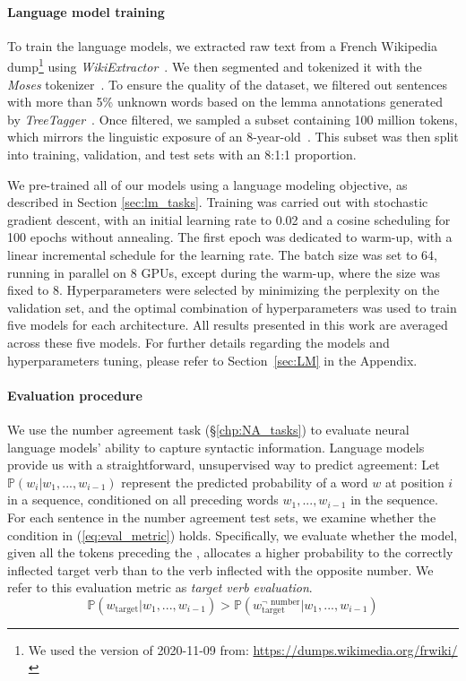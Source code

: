 \paragraph{Language model training} To train the language models, we extracted raw text from a French Wikipedia dump\footnote{We used the version of 2020-11-09 from: \url{https://dumps.wikimedia.org/frwiki/}} using
\textit{WikiExtractor}~\citep{Wikiextractor2015}. We then segmented and tokenized it with the \textit{Moses}
tokenizer~\citep{koehn2007moses}. To ensure the quality of the dataset, we filtered out sentences with more
than 5\% unknown words based on the lemma annotations generated by
\textit{TreeTagger}~\citep{schmid1995improvements}. Once filtered, we sampled
a subset containing 100 million tokens, which mirrors the linguistic exposure of an 8-year-old~\citep{brysbaert2016many}. This subset was then split into training, validation,
and test sets with an 8:1:1 proportion.


We pre-trained all of our models using a language modeling objective, as described in Section \ref{sec:lm_tasks}. Training was carried out with stochastic gradient descent, with an initial learning rate to 0.02 and a cosine scheduling for 100 epochs without annealing. The first epoch was dedicated to warm-up, with a linear incremental schedule for the learning rate. The batch size was set to 64, running in parallel on 8 GPUs, except during the warm-up, where the size was fixed to 8. Hyperparameters were selected by minimizing the perplexity on the validation set, and the optimal combination of hyperparameters was used to train five models for each architecture. All results presented in this work are averaged across these five models. For further details regarding the models and hyperparameters tuning, please refer to Section~\ref{sec:LM} in the Appendix.

\paragraph{Evaluation procedure}

We use the number
agreement task (\S\ref{chp:NA_tasks}) to evaluate neural language models' ability to capture syntactic information. Language models provide us with a straightforward, unsupervised way to predict agreement: Let $\mathbb{P}(w_i|w_1,...,w_{i-1})$ represent the predicted probability of a word $w$ at position $i$ in a sequence, conditioned on all preceding words $w_1,...,w_{i-1}$ in the sequence. For each sentence in the number agreement test sets, we examine whether the condition in (\ref{eq:eval_metric}) holds. Specifically, we evaluate whether the model, given all the tokens preceding the \target, allocates a higher probability to the correctly inflected target verb than to the verb inflected with the opposite number. We refer to this evaluation metric as \textit{target verb evaluation}.
\begin{equation}
\mathbb{P}(w_{\text{target}}|w_1,...,w_{i-1}) > \mathbb{P}(w_{\text{target}}^{\neg \text{ number}}|w_1,...,w_{i-1})
\label{eq:eval_metric}
\end{equation}

